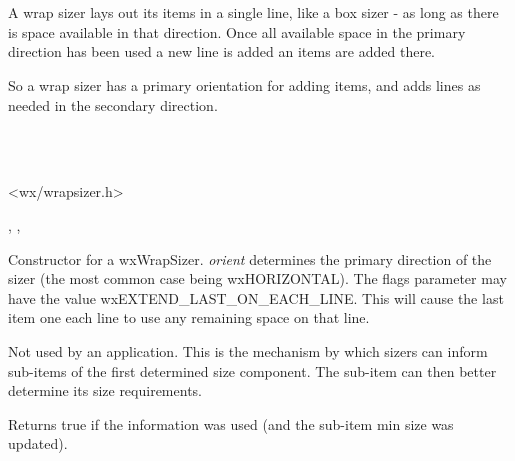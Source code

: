 \section{}\label{wxwrapsizer}

A wrap sizer lays out its items in a single line, like a box sizer - as long 
as there is space available in that direction. Once all available space in 
the primary direction has been used a new line is added an items are added there.

So a wrap sizer has a primary orientation for adding items, and adds lines
as needed in the secondary direction. 


\\
\\


<wx/wrapsizer.h>




, , 




\label{wxwrapsizerwxwrapsizer}


Constructor for a wxWrapSizer. {\it orient} determines the primary direction of
the sizer (the most common case being wxHORIZONTAL). The flags parameter may have 
the value wxEXTEND_LAST_ON_EACH_LINE. This will cause the last item one each line
to use any remaining space on that line.

\label{wxwrapsizerinformfirstdirection}


Not used by an application. This is the mechanism by which sizers can inform 
sub-items of the first determined size component. The sub-item can then better
determine its size requirements. 

Returns true if the information was used (and the sub-item min size was updated).



